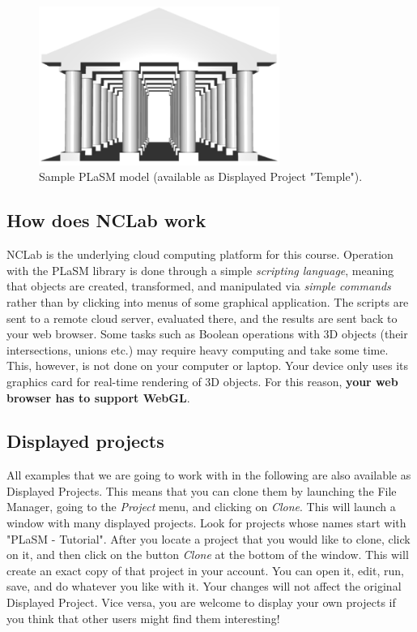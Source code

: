 \documentclass{article}
\begin{document}
\begin{figure}[!ht]
\begin{center}
\includegraphics[width=0.7\textwidth]{img/temple0.png}
\end{center}
\vspace{-4mm}
\caption{Sample PLaSM model (available as Displayed Project "Temple").}
\vspace{-1cm}
\label{fig:pisa}
\end{figure}
\newpage
\subsection{How does NCLab work}

NCLab is the underlying cloud computing platform for this course. Operation with the 
PLaSM library is done through a simple {\em scripting language}, meaning that  
objects are created, transformed, and manipulated via {\em simple commands} rather 
than by clicking into menus of some graphical application. The scripts are 
sent to a remote cloud server, evaluated there, and the results are sent back
to your web browser. Some tasks such as Boolean operations with 3D objects 
(their intersections, unions etc.) may require heavy computing and take some time.
This, however, is not done on your computer or laptop. Your device only uses 
its graphics card for real-time rendering of 3D objects. For this reason, {\bf your 
web browser has to support WebGL}.

\subsection{Displayed projects}

All examples that we are going to work with in the following are also available 
as Displayed Projects. This means that you can clone them by launching the File
Manager, going to the {\em Project} menu, and clicking on {\em Clone}. This will 
launch a window with many displayed projects. Look for projects whose names start 
with "PLaSM - Tutorial". After you locate a project that you would like to clone, 
click on it, and then click on the button {\em Clone} at the bottom of the window. 
This will create an exact copy of that project in your account. You can open it,
edit, run, save, and do whatever you like with it. Your changes will not affect 
the original Displayed Project. Vice versa, you are welcome to display your own 
projects if you think that other users might find them interesting!
\end{document}
